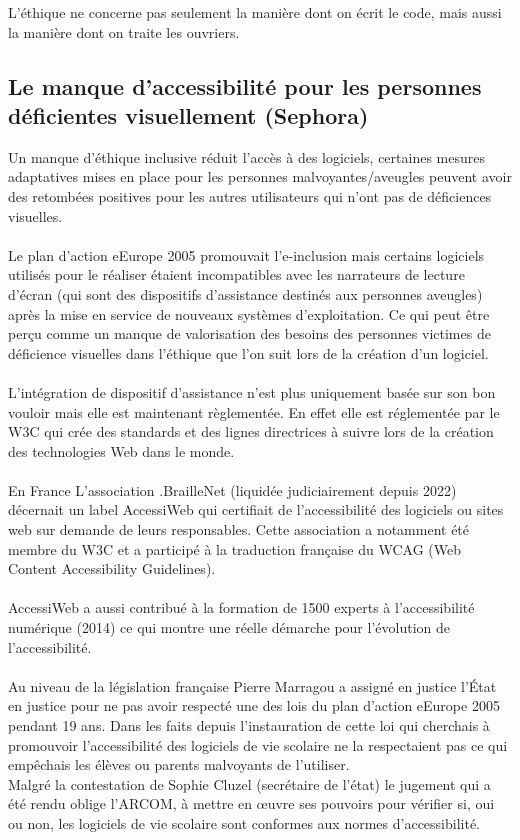 \documentclass{article}
\begin{document}
L’éthique ne concerne pas seulement la manière dont on écrit le code, mais aussi la manière dont on traite les ouvriers.\\ 

\subsection{Le manque d'accessibilité pour les personnes déficientes visuellement (Sephora)}

Un manque d’éthique inclusive réduit l’accès à des logiciels, certaines mesures adaptatives mises en place pour les personnes malvoyantes/aveugles peuvent avoir des retombées positives pour les autres utilisateurs qui n’ont pas de déficiences visuelles. \\ \\
Le plan d’action eEurope 2005 promouvait l’e-inclusion mais certains logiciels utilisés pour le réaliser étaient incompatibles avec les narrateurs de lecture d'écran (qui sont des dispositifs d’assistance destinés aux personnes aveugles) après la mise en service de nouveaux systèmes d'exploitation. Ce qui peut être perçu comme un manque de valorisation des besoins des personnes victimes de déficience visuelles dans l’éthique que l’on suit lors de la création d’un logiciel. 
\\\\
L’intégration de dispositif d’assistance n’est plus uniquement basée sur son bon vouloir mais elle est maintenant règlementée. En effet elle est réglementée par le W3C qui crée des standards et des lignes directrices à suivre lors de la création des technologies Web dans le monde. 
\\\\
En France L’association \cite{Wikipedia}.BrailleNet (liquidée judiciairement depuis 2022) décernait un label AccessiWeb qui certifiait de l’accessibilité des logiciels ou sites web sur demande de leurs responsables. Cette association a notamment été membre du W3C et a participé à la traduction française du WCAG (Web Content Accessibility Guidelines). 
\\\\
AccessiWeb a aussi contribué à la formation de 1500 experts à l’accessibilité numérique (2014) ce qui montre une réelle démarche pour l’évolution de l’accessibilité. 
\\\\
\cite{Gourvennec_2024}Au niveau de la législation française Pierre Marragou a assigné en justice l’État en justice pour ne pas avoir respecté une des lois du plan d’action eEurope 2005 pendant 19 ans. Dans les faits depuis l’instauration de cette loi qui cherchais à promouvoir l’accessibilité des logiciels de vie scolaire ne la respectaient pas ce qui empêchais les élèves ou parents malvoyants de l’utiliser. \\ Malgré la contestation de Sophie Cluzel (secrétaire de l’état) le jugement qui a été rendu oblige l’ARCOM, à mettre en œuvre ses pouvoirs pour vérifier si, oui ou non, les logiciels de vie scolaire sont conformes aux normes d’accessibilité. \\\\ 
\end{document}
